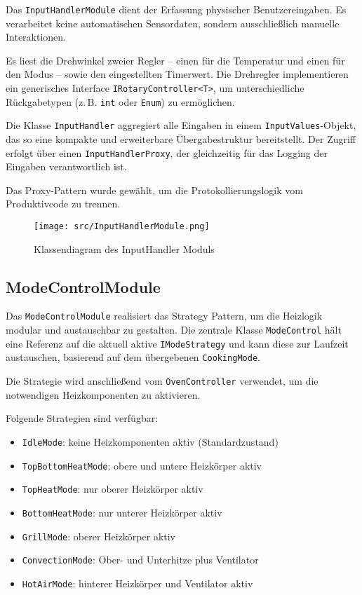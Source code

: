\documentclass[a4paper,12pt]{article}
\begin{document}
Das \texttt{InputHandlerModule} dient der Erfassung physischer Benutzereingaben. Es verarbeitet keine automatischen Sensordaten, sondern ausschließlich manuelle Interaktionen.

Es liest die Drehwinkel zweier Regler – einen für die Temperatur und einen für den Modus – sowie den eingestellten Timerwert. Die Drehregler implementieren ein generisches Interface \texttt{IRotaryController<T>}, um unterschiedliche Rückgabetypen (z.\,B. \texttt{int} oder \texttt{Enum}) zu ermöglichen.

Die Klasse \texttt{InputHandler} aggregiert alle Eingaben in einem \texttt{InputValues}-Objekt, das so eine kompakte und erweiterbare Übergabestruktur bereitstellt. Der Zugriff erfolgt über einen \texttt{InputHandlerProxy}, der gleichzeitig für das Logging der Eingaben verantwortlich ist.

Das Proxy-Pattern wurde gewählt, um die Protokollierungslogik vom Produktivcode zu trennen.

\begin{figure}[h!]
  \centering
  \texttt{[image: src/InputHandlerModule.png]}
  \caption{Klassendiagram des InputHandler Moduls}
  \label{fig:inputhandlermodule}
\end{figure}

\newpage

\subsection*{ModeControlModule}

Das \texttt{ModeControlModule} realisiert das Strategy Pattern, um die Heizlogik modular und austauschbar zu gestalten. Die zentrale Klasse \texttt{ModeControl} hält eine Referenz auf die aktuell aktive \texttt{IModeStrategy} und kann diese zur Laufzeit austauschen, basierend auf dem übergebenen \texttt{CookingMode}.

Die Strategie wird anschließend vom \texttt{OvenController} verwendet, um die notwendigen Heizkomponenten zu aktivieren.

Folgende Strategien sind verfügbar:

\begin{itemize}
    \item \texttt{IdleMode}: keine Heizkomponenten aktiv (Standardzustand)
    \item \texttt{TopBottomHeatMode}: obere und untere Heizkörper aktiv
    \item \texttt{TopHeatMode}: nur oberer Heizkörper aktiv
    \item \texttt{BottomHeatMode}: nur unterer Heizkörper aktiv
    \item \texttt{GrillMode}: oberer Heizkörper aktiv
    \item \texttt{ConvectionMode}: Ober- und Unterhitze plus Ventilator
    \item \texttt{HotAirMode}: hinterer Heizkörper und Ventilator aktiv
\end{itemize}
\end{document}
